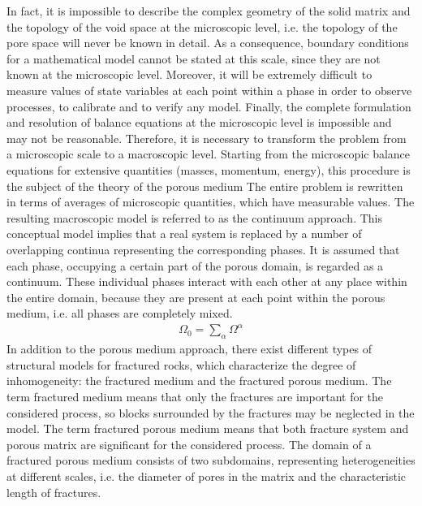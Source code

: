 In fact, it is impossible to describe the complex geometry of the
solid matrix and the topology of the void space at the microscopic
level, i.e. the topology of the pore space will never be known in
detail. As a consequence, boundary conditions for a mathematical
model cannot be stated at this scale, since they are not known at
the microscopic level. Moreover, it will be extremely difficult to
measure values of state variables at each point within a phase in
order to observe processes, to calibrate and to verify any model.
Finally, the complete formulation and resolution of balance
equations at the microscopic level is
impossible and may not be reasonable. Therefore, it is necessary
to transform the problem from a microscopic scale to a
macroscopic level. Starting from the
microscopic balance equations for extensive quantities (masses,
momentum, energy), this procedure is the subject of the theory of
the porous medium 
\cite{Bea:72,Die:85,Ehl:89,BeaBac:90,Kin:1992,Hel:97,LewSch:98,Boe:00}
The entire problem is rewritten in terms of averages of
microscopic quantities, which have measurable values. The
resulting macroscopic model is referred to as the continuum
approach. This conceptual model implies
that a real system is replaced by a number of overlapping continua
representing the corresponding phases. It is assumed that each
phase, occupying a certain part of the porous domain, is regarded
as a continuum. These individual phases interact with each other
at any place within the entire domain, because they are present at
each point within the porous medium, i.e. all phases are
completely mixed.
%
\begin{eqnarray}
\Omega_0
=
\sum_{\alpha} \Omega^\alpha
\end{eqnarray}
%
In addition to the porous medium approach, there exist different
types of structural models for fractured rocks, which characterize
the degree of inhomogeneity: the fractured medium and the fractured porous medium. The term fractured medium means that only the
fractures are important for the considered process, so blocks
surrounded by the fractures may be neglected in the model. The
term fractured porous medium means that both fracture system and
porous matrix are significant for the considered process. The
domain of a fractured porous medium consists of two subdomains,
representing heterogeneities at different scales, i.e. the
diameter of pores in the matrix and the characteristic length of
fractures.

